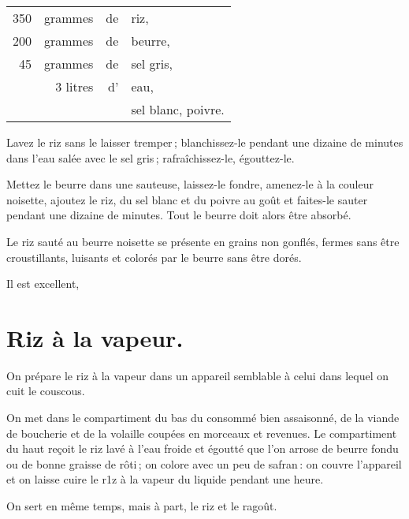 \footnotesize
\begin{longtable}{rrrp{16em}}
    350 & grammes  & de & riz,                                                                            \\
    200 & grammes  & de & beurre,                                                                         \\
     45 & grammes  & de & sel gris,                                                                       \\
        & 3 litres & d' & eau,                                                                            \\
        &          &    & sel blanc, poivre.                                                              \\
\end{longtable}
\normalsize

Lavez le riz sans le laisser tremper ; blanchissez-le pendant une dizaine de
minutes dans l'eau salée avec le sel gris ; rafraîchissez-le, égouttez-le.

Mettez le beurre dans une sauteuse, laissez-le fondre, amenez-le à la couleur
noisette, ajoutez le riz, du sel blanc et du poivre au goût et faites-le sauter
pendant une dizaine de minutes. Tout le beurre doit alors être absorbé.

Le riz sauté au beurre noisette se présente en grains non gonflés, fermes sans
être croustillants, luisants et colorés par le beurre sans être dorés.

Il est excellent,

\section*{\centering Riz à la vapeur.}
{}

On prépare le riz à la vapeur dans un appareil semblable à celui dans lequel
on cuit le couscous.

On met dans le compartiment du bas du consommé bien assaisonné, de la viande de
boucherie et de la volaille coupées en morceaux et revenues. Le compartiment du
haut reçoit le riz lavé à l'eau froide et égoutté que l'on arrose de beurre
fondu ou de bonne graisse de rôti ; on colore avec un peu de safran : on couvre
l'appareil et on laisse cuire le r1z à la vapeur du liquide pendant une heure.

On sert en même temps, mais à part, le riz et le ragoût.


